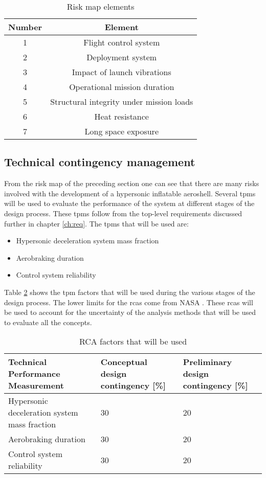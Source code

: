 \begin{table}[h]
\centering
\caption{Risk map elements}
\label{tab:riskelements}
\begin{tabular}{|c|c|}
\hline
\textbf{Number} & \textbf{Element} \\
\hline
1 & Flight control system\\
2 & Deployment system\\
3 & Impact of launch vibrations\\
4 & Operational mission duration\\
5 & Structural integrity under mission loads\\
6 & Heat resistance\\
7 & Long space exposure\\
\hline
\end{tabular}
\end{table}

\subsection{Technical contingency management}
\label{sec:tca}
From the risk map of the preceding section one can see that there are many risks involved with the development of a hypersonic inflatable aeroshell. Several \gls{tpm}s  will be used to evaluate the performance of the system at different stages of the design process. These \gls{tpm}s follow from the top-level requirements discussed further in chapter \ref{ch:req}. The \gls{tpm}s that will be used are:
\begin{itemize}
	\item Hypersonic deceleration system mass fraction
	\item Aerobraking duration
	\item Control system reliability
\end{itemize}
Table \ref{tab:tpm} shows the \acrfull{tpm} factors that will be used during the various stages of the design process. The lower limits for the \gls{rca}s come from NASA \cite{GoddardSpaceFlightCenter2013}. These \gls{rca}s will be used to account for the uncertainty of the analysis methods that will be used to evaluate all the concepts.

\begin{table}[h]
	\centering
	\caption{RCA factors that will be used}
	\label{tab:tpm}
	\begin{tabular}{|p{}|p{}|p{}|}
		\hline
		\textbf{Technical Performance Measurement} & \textbf{Conceptual design contingency [\%]} & \textbf{Preliminary design contingency [\%]} \\ \hline
		Hypersonic deceleration system mass fraction & 30 & 20 \\ \hline
		Aerobraking duration & 30 & 20 \\ \hline
		Control system reliability & 30 & 20 \\ \hline
	\end{tabular}
\end{table}